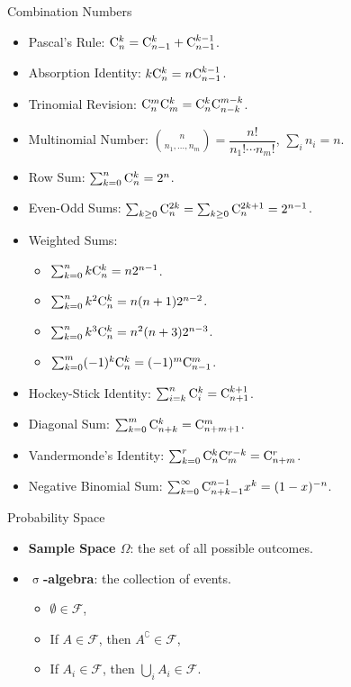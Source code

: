 \documentclass[landscape,a4paper]{article}
\begin{document}
	
	\begin{cheatsheetcolumns}
		\begin{card}{Combination Numbers}
			\begin{itemize}
				\item Pascal's Rule: $\mathrm{C}_{n}^{k}=\mathrm{C}_{n-1}^{k}+\mathrm{C}_{n-1}^{k-1}$.
				\item Absorption Identity: $k\mathrm{C}_{n}^{k}=n\mathrm{C}_{n-1}^{k-1}$.
				\item Trinomial Revision: $\mathrm{C}_{n}^{m}\mathrm{C}_{m}^{k}=\mathrm{C}_{n}^{k}\mathrm{C}_{n-k}^{m-k}$.
				\item Multinomial Number: $\binom{n}{n_1,\dots,n_m}=\dfrac{n!}{n_1!\cdots n_m!}$, $\sum_i n_i=n$.
				\item Row Sum: $\sum_{k=0}^{n}\mathrm{C}_{n}^{k}=2^n$.
				\item Even-Odd Sums: $\sum_{k\ge 0} \mathrm{C}_{n}^{2k}=\sum_{k\ge 0}\mathrm{C}_{n}^{2k+1}=2^{n-1}$.
				\item Weighted Sums:
				\begin{itemize} 
					\item $\sum_{k=0}^{n}k\mathrm{C}_{n}^{k}=n2^{n-1}$.
				\item $\sum_{k=0}^{n}k^2\mathrm{C}_{n}^{k}=n(n+1)2^{n-2}$.
				\item  $\sum_{k=0}^{n}k^3\mathrm{C}_{n}^{k}=n^2(n+3)2^{n-3}$.
				\item  $\sum_{k=0}^m(-1)^k\mathrm{C}_{n}^{k}=(-1)^m\mathrm{C}_{n-1}^{m}$.
				\end{itemize}
				\item Hockey-Stick Identity: $\sum_{i=k}^n\mathrm{C}_{i}^{k}=\mathrm{C}_{n+1}^{k+1}$.
				\item Diagonal Sum: $\sum_{k=0}^m \mathrm{C}_{n+k}^{k}=\mathrm{C}_{n+m+1}^{m}$.
				\item Vandermonde's Identity: $\sum_{k=0}^r \mathrm{C}_{n}^{k}\mathrm{C}_{m}^{r-k}=\mathrm{C}_{n+m}^{r}$.
				\item Negative Binomial Sum: $\sum_{k=0}^\infty \mathrm{C}_{n+k-1}^{n-1}x^k=(1-x)^{-n}$.
			\end{itemize}
		\end{card}
		\begin{card}{Probability Space}
			\begin{itemize}
				\item \textbf{Sample Space $\Omega$}: the set of all possible outcomes.
				\item \textbf{$\upsigma$-algebra}: the collection of events.
				\begin{itemize}
					\item $\emptyset\in\mathcal F$,
					\item If $A\in\mathcal F$, then $A^\complement\in \mathcal F$,
					\item If $A_i\in\mathcal F$, then $\bigcup_i A_i\in\mathcal F$.

\end{itemize}
\end{itemize}
\end{card}
\end{cheatsheetcolumns}
\end{document}
